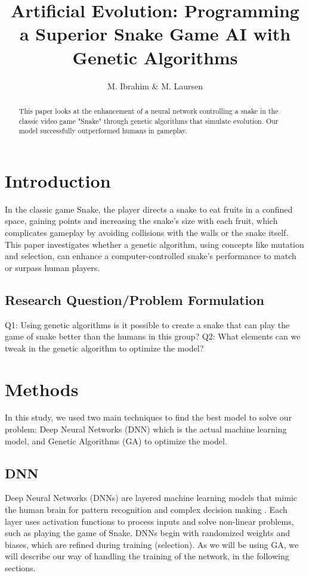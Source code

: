 \documentclass{article}
\title{Artificial Evolution: Programming a Superior Snake Game AI with Genetic Algorithms}
\author{M. Ibrahim & M. Laursen}
\begin{document}
\maketitle

\begin{abstract}
This paper looks at the enhancement of a neural network controlling a snake in the classic video game "Snake" through genetic algorithms that simulate evolution. Our model successfully outperformed humans in gameplay.
\end{abstract}

\section{Introduction}

In the classic game Snake, the player directs a snake to eat fruits in a confined space, gaining points and increasing the snake's size with each fruit, which complicates gameplay by avoiding collisions with the walls or the snake itself. This paper investigates whether a genetic algorithm, using concepts like mutation and selection, can enhance a computer-controlled snake's performance to match or surpass human players.

\subsection{Research Question/Problem Formulation}

Q1: Using genetic algorithms is it possible to create a snake that can play the game of snake better than the humans in this group?
\newline
Q2: What elements can we tweak in the genetic algorithm to optimize the model?

\section{Methods}

In this study, we used two main techniques to find the best model to solve our problem: Deep Neural Networks (DNN) which is the actual machine learning model, and Genetic Algorithms (GA) to optimize the model.

\subsection{DNN}

Deep Neural Networks (DNNs) are layered machine learning models that mimic the human brain for pattern recognition and complex decision making \cite{cichy2019deep}. Each layer uses activation functions to process inputs and solve non-linear problems, such as playing the game of Snake. DNNs begin with randomized weights and biases, which are refined during training (selection). As we will be using GA, we will describe our way of handling the training of the network, in the following sections.
\end{document}
